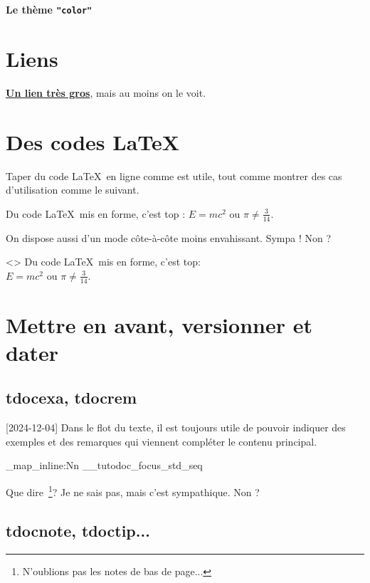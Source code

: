 \documentclass[theme = color]{tutodoc}
\newcommand\thisstyle{color}
\newcommand\myexrmktext{
    \tdocversion{1.7.0}[2024-12-04]
    Dans le flot du texte, il est toujours utile de pouvoir indiquer des exemples et des remarques qui viennent compléter le contenu principal.
}
\newcommand\myhighlightedtext{
    Que dire\,%
    \footnote{
        N'oublions pas les notes de bas de page...
    }?
    Je ne sais pas, mais c'est sympathique. Non ?
}
\begin{document}
\textsf{\Huge\bfseries Le thème \texttt{"\thisstyle"}}

\section{Liens}

{\Large\bfseries \href{https://github.com/bc-tools/for-latex/tree/main/tutodoc}{Un lien très gros}}, mais au moins on le voit.



\section{Des codes \LaTeX}

Taper du code \LaTeX\ en ligne comme  est utile, tout comme montrer des cas d'utilisation comme le suivant.

\begin{tdoclatex}
Du code \LaTeX\ mis en forme, c'est top : $E = m c^2$ ou $\pi \neq \frac{3}{14}$.
\end{tdoclatex}


On dispose aussi d'un mode côte-à-côte moins envahissant. Sympa ! Non ?

\begin{tdoclatex}<>
Du code \LaTeX\ mis en forme, c'est top: \\
$E = m c^2$ ou $\pi \neq \frac{3}{14}$.
\end{tdoclatex}



\section{Mettre en avant, versionner et dater}

\subsection{tdocexa, tdocrem}

\myexrmktext

\ExplSyntaxOn

\seq_map_inline:Nn \g__tutodoc_focus_std_seq {
    \begin{tdoc#1}
        \myhighlightedtext
    \end{tdoc#1}
}

\ExplSyntaxOff



\subsection{tdocnote, tdoctip...}
\end{document}
